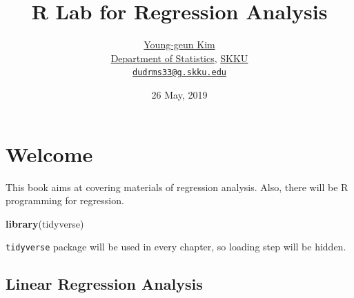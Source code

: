 \documentclass[]{book}
\title{R Lab for Regression Analysis}
\author{\href{https://github.com/ygeunkim}{Young-geun Kim}\\
\href{https://stat.skku.edu/stat/index.jsp}{Department of Statistics}, \href{https://www.skku.edu/skku/index.do}{SKKU}\\
\href{mailto:dudrms33@g.skku.edu}{\nolinkurl{dudrms33@g.skku.edu}}}
\date{26 May, 2019}
\newenvironment{Shaded}{\begin{snugshade}}{\end{snugshade}}
\newcommand{\CommentTok}[1]{\textcolor[rgb]{0.56,0.35,0.01}{\textit{#1}}}
\newcommand{\DataTypeTok}[1]{\textcolor[rgb]{0.13,0.29,0.53}{#1}}
\newcommand{\KeywordTok}[1]{\textcolor[rgb]{0.13,0.29,0.53}{\textbf{#1}}}
\newcommand{\NormalTok}[1]{#1}
\newcommand{\OperatorTok}[1]{\textcolor[rgb]{0.81,0.36,0.00}{\textbf{#1}}}
\newcommand{\StringTok}[1]{\textcolor[rgb]{0.31,0.60,0.02}{#1}}
\let\oldmaketitle\maketitle
\theoremstyle{definition}
\theoremstyle{definition}
\theoremstyle{definition}
\theoremstyle{remark}
\begin{document}
\maketitle

\begin{titlepage}
  
\end{titlepage}

\let\maketitle\oldmaketitle
\maketitle

{
\setcounter{tocdepth}{1}
\tableofcontents
}
\hypertarget{welcome}{%
\chapter*{Welcome}\label{welcome}}

This book aims at covering materials of regression analysis. Also, there will be R programming for regression.

\begin{Shaded}
\begin{Highlighting}[]
\KeywordTok{library}\NormalTok{(tidyverse)}
\end{Highlighting}
\end{Shaded}

\texttt{tidyverse} package will be used in every chapter, so loading step will be hidden.

\hypertarget{linear-regression-analysis}{%
\section*{Linear Regression Analysis}\label{linear-regression-analysis}}

\begin{Shaded}
\end{Shaded}
\end{document}
